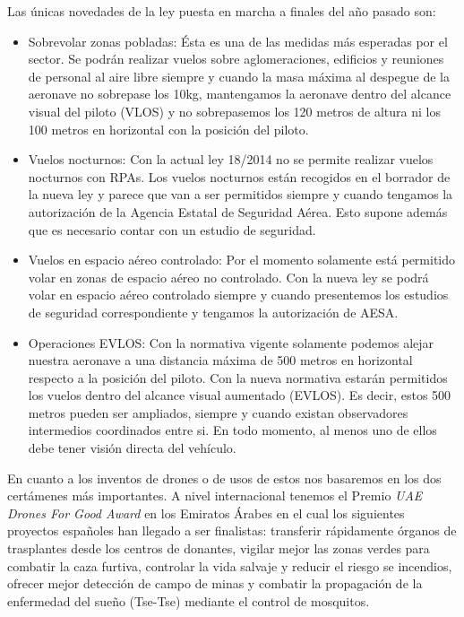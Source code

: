 \hspace{-1cm} Las únicas novedades de la ley puesta en marcha a finales del año pasado son:

	\begin{itemize}
		\item Sobrevolar zonas pobladas: Ésta es una de las medidas más esperadas por el sector. Se podrán realizar vuelos sobre aglomeraciones, edificios y reuniones de personal al aire libre siempre y cuando la masa máxima al despegue de la aeronave no sobrepase los 10kg, mantengamos la aeronave dentro del alcance visual del piloto (VLOS) y no sobrepasemos los 120 metros de altura ni los 100 metros en horizontal con la posición del piloto.
		\item Vuelos nocturnos: Con la actual ley 18/2014 no se permite realizar vuelos nocturnos con RPAs. Los vuelos nocturnos están recogidos en el borrador de la nueva ley y parece que van a ser permitidos siempre y cuando tengamos la autorización de la Agencia Estatal de Seguridad Aérea. Esto supone además que es necesario contar con un estudio de seguridad.
		\item Vuelos en espacio aéreo controlado: Por el momento solamente está permitido volar en zonas de espacio aéreo no controlado. Con la nueva ley se podrá volar en espacio aéreo controlado siempre y cuando presentemos los estudios de seguridad correspondiente y tengamos la autorización de AESA.
		\item Operaciones EVLOS: Con la normativa vigente solamente podemos alejar nuestra aeronave a una distancia máxima de 500 metros en horizontal respecto a la posición del piloto. Con la nueva normativa estarán permitidos los vuelos dentro del alcance visual aumentado (EVLOS). Es decir, estos 500 metros pueden ser ampliados, siempre y cuando existan observadores intermedios coordinados entre si. En todo momento, al menos uno de ellos debe tener visión directa del vehículo.
	\end{itemize}	 

\hspace{1cm} En cuanto a los inventos de drones o de usos de estos nos basaremos en los dos certámenes más importantes. A nivel internacional tenemos el Premio \textit{UAE Drones For Good Award} en los Emiratos Árabes en el cual los siguientes proyectos españoles han llegado a ser finalistas: transferir rápidamente órganos de trasplantes desde los centros de donantes, vigilar mejor las zonas verdes para combatir la caza furtiva, controlar la vida salvaje y reducir el riesgo se incendios, ofrecer mejor detección de campo de minas y combatir la propagación de la enfermedad del sueño (Tse-Tse) mediante el control de mosquitos.

